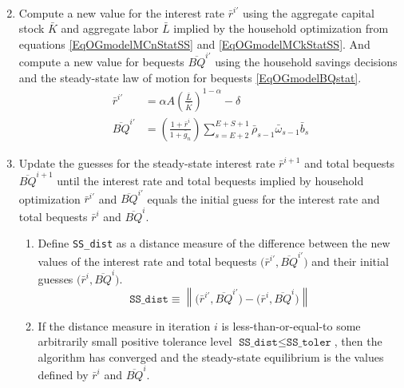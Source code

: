 \documentclass[letterpaper,12pt]{article}
\theoremstyle{definition}
\newcommand\norm[1]{\left\lVert#1\right\rVert}
\begin{document}
\begin{enumerate}
\begin{align}
      \end{align}
      \item Compute a new value for the interest rate $\bar{r}^{i'}$ using the aggregate capital stock $\bar{K}$ and aggregate labor $\bar{L}$ implied by the household optimization from equations \eqref{EqOGmodelMCnStatSS} and \eqref{EqOGmodelMCkStatSS}. And compute a new value for bequests $\overline{BQ}^{i'}$ using the household savings decisions and the steady-state law of motion for bequests \eqref{EqOGmodelBQstat}.
      \begin{align}
        \bar{r}^{i'} &= \alpha A\left(\frac{\bar{L}}{\bar{K}}\right)^{1-\alpha} - \delta \label{EqOGmodelSSrnew} \\
        \overline{BQ}^{i'} &= \left(\frac{1 + \bar{r}^i}{1 + \bar{g}_{n}}\right)\sum_{s=E+2}^{E+S+1}\bar{\rho}_{s-1}\bar{\omega}_{s-1}\bar{b}_{s} \label{EqOGmodelSSBQnew}
      \end{align}
      \item Update the guesses for the steady-state interest rate $\bar{r}^{i+1}$ and total bequests $\overline{BQ}^{i+1}$ until the interest rate and total bequests implied by household optimization $\bar{r}^{i'}$ and $\overline{BQ}^{i'}$ equals the initial guess for the interest rate and total bequests $\bar{r}^{i}$ and $\overline{BQ}^{i}$.
        \begin{enumerate}
          \item Define \texttt{SS\_dist} as a distance measure of the difference between the new values of the interest rate and total bequests $\bigl(\bar{r}^{i'},\overline{BQ}^{i'}\bigr)$ and their initial guesses $\bigl(\bar{r}^{i},\overline{BQ}^{i}\bigr)$.
          \begin{equation}\label{EqOGmodelSSdist}
            \texttt{SS\_dist} \equiv \norm{\bigl(\bar{r}^{i'},\overline{BQ}^{i'}\bigr) - \bigl(\bar{r}^{i},\overline{BQ}^{i}\bigr)}
          \end{equation}

          \item If the distance measure in iteration $i$ is less-than-or-equal-to some arbitrarily small positive tolerance level $\texttt{SS\_dist}\leq\texttt{SS\_toler}$, then the algorithm has converged and the steady-state equilibrium is the values defined by $\bar{r}^i$ and $\overline{BQ}^i$.


\end{enumerate}
\end{enumerate}
\end{document}
